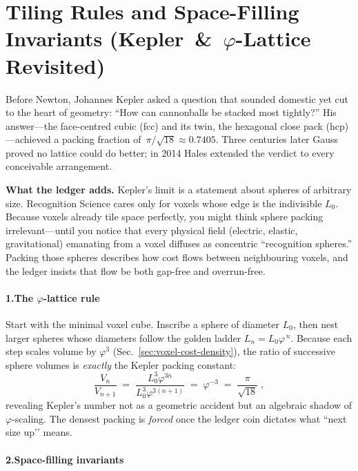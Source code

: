 \documentclass[11pt,oneside]{book}
\begin{document}
\section{Tiling Rules and Space-Filling Invariants (Kepler\ \&\ $\varphi$-Lattice Revisited)}
\label{sec:tiling-rules}

Before Newton, Johannes Kepler asked a question that sounded domestic yet cut to the heart of geometry: “How can cannonballs be stacked most tightly?”  
His answer—the face-centred cubic (fcc) and its twin, the hexagonal close pack (hcp)—achieved a packing fraction of $\,\pi/\sqrt{18}\approx0.7405$.  
Three centuries later Gauss proved no lattice could do better; in 2014 Hales extended the verdict to every conceivable arrangement.

\medskip
\noindent\textbf{What the ledger adds.}  
Kepler’s limit is a statement about spheres of arbitrary size.  
Recognition Science cares only for voxels whose edge is the indivisible $L_{0}$.  
Because voxels already tile space perfectly, you might think sphere packing irrelevant—until you notice that every physical field (electric, elastic, gravitational) emanating from a voxel diffuses as concentric “recognition spheres.”  
Packing those spheres describes how cost flows between neighbouring voxels, and the ledger insists that flow be both gap-free and overrun-free.  

\paragraph*{1.\;The $\varphi$-lattice rule}

Start with the minimal voxel cube.  
Inscribe a sphere of diameter $L_{0}$, then nest larger spheres whose diameters follow the golden ladder $L_{n}=L_{0}\varphi^{\,n}$.  
Because each step scales volume by $\varphi^{3}$ (Sec.~\ref{sec:voxel-cost-density}), the ratio of successive sphere volumes is \emph{exactly} the Kepler packing constant:
\[
  \frac{V_{n}}{V_{n+1}}
  \;=\;
  \frac{L_{0}^{3}\varphi^{3n}}
       {L_{0}^{3}\varphi^{3(n+1)}}    
  \;=\;
  \varphi^{-3}
  \;=\;
  \frac{\pi}{\sqrt{18}}\;,
\]
revealing Kepler’s number not as a geometric accident but an algebraic
shadow of $\varphi$-scaling.  
The densest packing is \emph{forced} once the ledger coin dictates what “next size up’’ means.

\paragraph*{2.\;Space-filling invariants}
\end{document}
